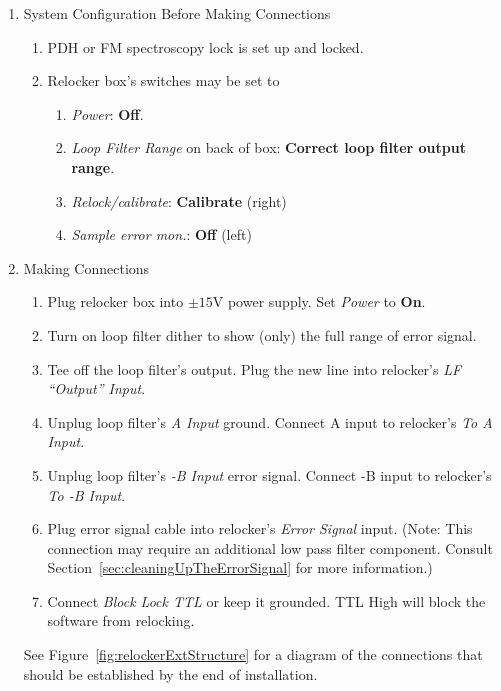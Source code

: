 \documentclass[10pt]{report}
\begin{document}
\begin{enumerate}
    \item System Configuration Before Making Connections
    \begin{enumerate}
        \item PDH or FM spectroscopy lock is set up and locked.
        \item Relocker box's switches may be set to
        \begin{enumerate}
            \item \textit{Power}: \textbf{Off}.
            \item \textit{Loop Filter Range} on back of box: \textbf{Correct loop filter output range}.
            \item \textit{Relock/calibrate}: \textbf{Calibrate} (right)
            \item \textit{Sample error mon.}: \textbf{Off} (left)
        \end{enumerate}
    \end{enumerate}
    
    \item Making Connections
    \begin{enumerate}
        \item Plug relocker box into $\pm15 \text{V}$ power supply. Set \textit{Power} to \textbf{On}.
        \item Turn on loop filter dither to show (only) the full range of error signal.
        \item Tee off the loop filter's output. Plug the new line into relocker's \textit{LF ``Output'' Input}.
        \item Unplug loop filter's \textit{A Input} ground. Connect A input to relocker's \textit{To A Input}.
        \item Unplug loop filter's \textit{-B Input} error signal. Connect -B input to relocker's \textit{To -B Input}.
        \item Plug error signal cable into relocker's \textit{Error Signal} input. (Note: This connection may require an additional low pass filter component. Consult Section~\ref{sec:cleaningUpTheErrorSignal} for more information.)
        \item Connect \textit{Block Lock TTL} or keep it grounded. TTL High will block the software from relocking.
    \end{enumerate}
    
    See Figure~\ref{fig:relockerExtStructure} for a diagram of the connections that should be established by the end of installation.
    

\end{enumerate}
\end{document}
